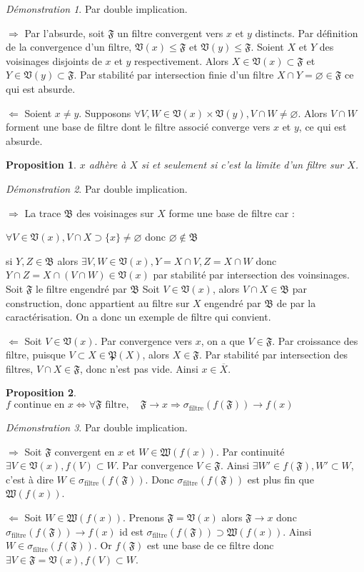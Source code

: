 \documentclass[a4paper, 11pt, french]{book}
\newenvironment{itemise}{\itemize}{\enditemize}
\theoremstyle{plain} %
\newtheorem{proposition}{Proposition}
\theoremstyle{definition} %
\theoremstyle{remark} %
\newtheorem*{demonstration}{Démonstration}
\newcommand{\1}{\mathds{1}}
\newcommand\vide{\varnothing}
\renewcommand{\frak}[1]{\mathfrak{#1}}
\newcommand\equivalence[3]{
	\begin{demonstration}
		#1
		\begin{itemise}
			\item[$\Longrightarrow$] #2
			\item[$\Longleftarrow$] #3
		\end{itemise}
	\end{demonstration}
}
\begin{document}
\equivalence{Par double implication.}{
	Par l'absurde, soit $\frak{F}$ un filtre convergent vers $x$ et $y$ distincts.
		Par définition de la convergence d'un filtre, $\frak{V}(x)\leqslant\frak{F}$ et $\frak{V}(y)\leqslant\frak{F}$.
		Soient $X$ et $Y$ des voisinages disjoints de $x$ et $y$ respectivement.
		Alors $X\in\frak{V}(x)\subset\frak{F}$ et $Y\in\frak{V}(y)\subset\frak{F}$.
		Par stabilité par intersection finie d'un filtre $X\cap Y=\vide\in\frak{F}$ ce qui est absurde.
}{
	Soient $x\neq y$.
		Supposons $\forall V, W\in\frak{V}(x)\times\frak{V}(y), V\cap W\neq\vide$.
		Alors $V\cap W$ forment une base de filtre dont le filtre associé converge vers $x$ et $y$, ce qui est absurde.
}

\begin{proposition}
	$x$ adhère à $X$ si et seulement si c'est la limite d'un filtre sur $X$.
\end{proposition}

\equivalence{Par double implication.}{
	La trace $\frak{B}$ des voisinages sur $X$ forme une base de filtre car :
		\begin{itemise}
			\item $\forall V\in\frak{V}(x), V\cap X\supset\{x\}\neq\vide$ donc $\vide\notin\frak{B}$
			\item si $Y, Z\in\frak{B}$ alors $\exists V, W\in\frak{V}(x), Y=X\cap V, Z=X\cap W$ donc $Y\cap Z=X\cap(V\cap W)\in\frak{V}(x)$ par stabilité par intersection des voinsinages.
		\end{itemise}
		Soit $\frak{F}$ le filtre engendré par $\frak{B}$
		Soit $V\in\frak{V}(x)$, alors $V\cap X\in\frak{B}$ par construction, donc appartient au filtre sur $X$ engendré par $\frak{B}$ de par la caractérisation.
		On a donc un exemple de filtre qui convient.
}{
	Soit $V\in\frak{V}(x)$.
		Par convergence vers $x$, on a que $V\in\frak{F}$.
		Par croissance des filtre, puisque $V\subset X\in\frak{P}(X)$, alors $X\in\frak{F}$.
		Par stabilité par intersection des filtres, $V\cap X\in\frak{F}$, donc n'est pas vide.
		Ainsi $x\in\overline{X}$.
}

\begin{proposition}
	$f\text{ continue en }x\iff\forall\frak{F}\text{ filtre},\quad\frak{F}\rightarrow x\Rightarrow\sigma_\text{filtre}(f(\frak{F}))\rightarrow f(x)$
\end{proposition}

\equivalence{Par double implication.}{
	Soit $\frak{F}$ convergent en $x$ et $W\in\frak{W}(f(x))$.
		Par continuité $\exists V\in\frak{V}(x), f(V)\subset W$.
		Par convergence $V\in\frak{F}$.
		Ainsi $\exists W'\in f(\frak{F}), W'\subset W$, c'est à dire $W\in\sigma_\text{filtre}(f(\frak{F}))$.
		Donc $\sigma_\text{filtre}(f(\frak{F}))$ est plus fin que $\frak{W}(f(x))$.
}{
	Soit $W\in\frak{W}(f(x))$.
		Prenons $\frak{F}=\frak{V}(x)$ alors $\frak{F}\rightarrow x$ donc $\sigma_\text{filtre}(f(\frak{F}))\rightarrow f(x)$ id est $\sigma_\text{filtre}(f(\frak{F}))\supset\frak{W}(f(x))$.
		Ainsi $W\in\sigma_\text{filtre}(f(\frak{F}))$.
		Or $f(\frak{F})$ est une base de ce filtre donc $\exists V\in\frak{F}=\frak{V}(x), f(V)\subset W$.
}
\end{document}
